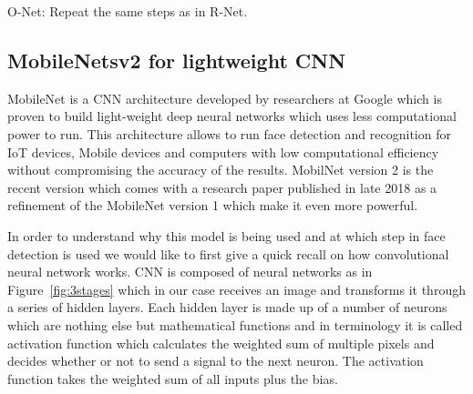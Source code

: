  O-Net: Repeat the same steps as in R-Net.

\subsection{MobileNetsv2 for lightweight CNN}

MobileNet is a CNN architecture developed by researchers at Google which is proven to build light-weight deep neural networks which uses less computational power to run. This architecture allows to run face detection and recognition for IoT devices, Mobile devices and computers with low computational efficiency without compromising the accuracy of the results. MobilNet version 2 is the recent version which comes with a research paper published in late 2018 as a refinement of the MobileNet version 1 which make it even more powerful. 

In order to understand why this model is being used and at which step in face detection is used we would like to first give a quick recall on how convolutional neural network works. CNN is composed of neural networks as in Figure~\ref{fig:3stages} which in our case receives an image  and transforms it through a series of hidden layers. Each hidden layer is made up of a number of neurons which are nothing else but mathematical functions and in terminology it is called activation function which calculates the weighted sum of multiple pixels and decides whether or not to send a signal to the next neuron. The activation function takes the weighted sum of all inputs plus the bias.

